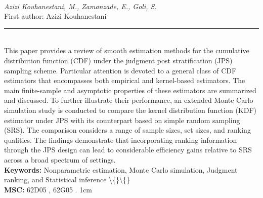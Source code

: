 \documentclass[10pt,twoside]{article}
\begin{document}
\noindent\begin{minipage}[t][\textheight]{\textwidth}
\\[0.35em]
{\itshape Azizi Kouhanestani, M., Zamanzade, E., Goli, S.}\\[0.2em]
{\footnotesize First author: Azizi Kouhanestani}\\[0.45em]
\noindent\rule{\textwidth}{0.3pt}\\[0.4em]
{\footnotesize  This paper provides a review of smooth estimation methods for the cumulative distribution function (CDF) under the judgment post stratification (JPS) sampling scheme. Particular attention is devoted to a general class of CDF estimators that encompasses both empirical and kernel-based estimators. The main finite-sample and asymptotic properties of these estimators are summarized and discussed. To further illustrate their performance, an extended Monte Carlo simulation study is conducted to compare the kernel distribution function (KDF) estimator under JPS with its counterpart based on simple random sampling (SRS). The comparison considers a range of sample sizes, set sizes, and ranking qualities. The findings demonstrate that incorporating ranking information through the JPS design can lead to considerable efficiency gains relative to SRS across a broad spectrum of settings.}\\[0.4em]
{\footnotesize\bfseries Keywords:} {\footnotesize Nonparametric estimation, Monte Carlo simulation, Judgment ranking, and Statistical inference \textbackslash\{\}\textbackslash\{\}}\\[0.15em]
{\footnotesize\bfseries MSC:} {\footnotesize 62D05 , 62G05 . 1cm}\\
\vfill
\end{minipage}
\newpage
\end{document}
